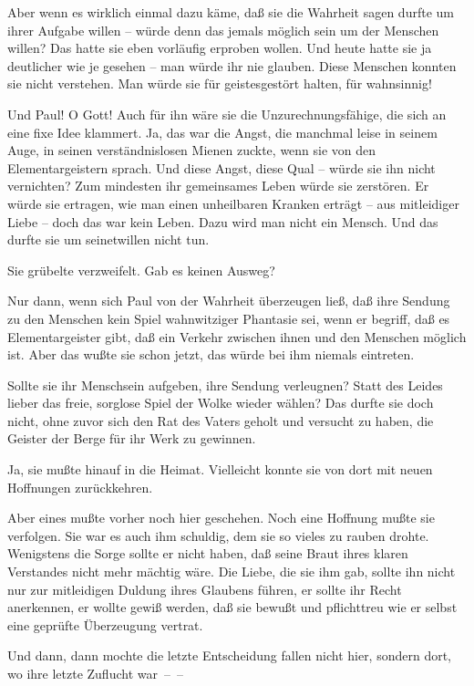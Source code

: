 Aber wenn es wirklich einmal dazu käme, daß sie die Wahrheit sagen
durfte um ihrer Aufgabe willen – würde denn das jemals möglich sein
um der Menschen willen? Das hatte sie eben vorläufig erproben
wollen. Und heute hatte sie ja deutlicher wie je gesehen – man
würde ihr nie glauben. Diese Menschen konnten sie nicht verstehen.
Man würde sie für geistesgestört halten, für wahnsinnig!

Und Paul! O Gott! Auch für ihn wäre sie die Unzurechnungsfähige,
die sich an eine fixe Idee klammert. Ja, das war die Angst, die
manchmal leise in seinem Auge, in seinen verständnislosen Mienen
zuckte, wenn sie von den Elementargeistern sprach. Und diese Angst,
diese Qual – würde sie ihn nicht vernichten? Zum mindesten ihr
gemeinsames Leben würde sie zerstören. Er würde sie ertragen, wie
man einen unheilbaren Kranken erträgt – aus mitleidiger Liebe –
doch das war kein Leben. Dazu wird man nicht ein Mensch. Und das
durfte sie um seinetwillen nicht tun.

Sie grübelte verzweifelt. Gab es keinen Ausweg?

Nur dann, wenn sich Paul von der Wahrheit überzeugen ließ, daß ihre
Sendung zu den Menschen kein Spiel wahnwitziger Phantasie sei, wenn
er begriff, daß es Elementargeister gibt, daß ein Verkehr zwischen
ihnen und den Menschen möglich ist. Aber das wußte sie schon jetzt,
das würde bei ihm niemals eintreten.

Sollte sie ihr Menschsein aufgeben, ihre Sendung verleugnen? Statt
des Leides lieber das freie, sorglose Spiel der Wolke wieder
wählen? Das durfte sie doch nicht, ohne zuvor sich den Rat des
Vaters geholt und versucht zu haben, die Geister der Berge für ihr
Werk zu gewinnen.

Ja, sie mußte hinauf in die Heimat. Vielleicht konnte sie von dort
mit neuen Hoffnungen zurückkehren.

Aber eines mußte vorher noch hier geschehen. Noch eine Hoffnung
mußte sie verfolgen. Sie war es auch ihm schuldig, dem sie so
vieles zu rauben drohte. Wenigstens die Sorge sollte er nicht
haben, daß seine Braut ihres klaren Verstandes nicht mehr mächtig
wäre. Die Liebe, die sie ihm gab, sollte ihn nicht nur zur
mitleidigen Duldung ihres Glaubens führen, er sollte ihr Recht
anerkennen, er wollte gewiß werden, daß sie bewußt und pflichttreu
wie er selbst eine geprüfte Überzeugung vertrat.

Und dann, dann mochte die letzte Entscheidung fallen nicht hier,
sondern dort, wo ihre letzte Zuflucht war~–~–

